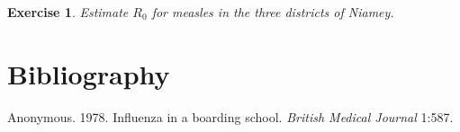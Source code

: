 \documentclass{article}\usepackage[]{graphicx}\usepackage[]{color}
\newcommand{\R}{\textsf{R}}
\newcommand{\code}[1]{\texttt{#1}}
\theoremstyle{exercise}
\newtheorem{exercise}{Exercise}
\begin{document}
\begin{exercise}
Estimate $R_0$ for measles in the three districts of Niamey.
\end{exercise}

\section*{Bibliography}

Anonymous. 1978. Influenza in a boarding school. \textit{British Medical Journal} 1:587.

% 
% 
% 
% 
% 
\end{document}
